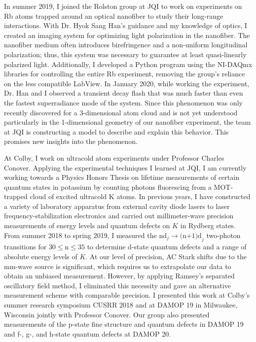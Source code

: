 \documentclass[12pt]{article}
\begin{document}
In summer 2019, I joined the Rolston group at JQI to work on  experiments on Rb atoms trapped around an optical nanofiber to study their long-range interactions. With Dr. Hyok Sang Han's guidance and my knowledge of optics, I created an imaging system for optimizing light polarization in the nanofiber. The nanofiber medium often introduces birefringence and a non-uniform longitudinal polarization; thus, this system was necessary to guarantee at least  quasi-linearly polarized light. Additionally, I developed a Python program using the NI-DAQmx libraries for controlling the entire Rb experiment, removing the group's reliance on the less compatible LabView. In January 2020, while working the experiment, Dr. Han and I observed a transient decay flash that was much faster than even the fastest superradiance mode of the system. Since this phenomenon was only recently discovered for a 3-dimensional atom cloud and is not yet understood particularly in the 1-dimensional geometry of our nanofiber experiment, the team at JQI is constructing a model to describe and explain this behavior. This promises new insights into the phenomenon.  \\ \vspace{-10pt}

At Colby, I work on ultracold atom experiments under Professor Charles Conover. Applying the experimental techniques I learned at JQI, I am currently working towards a Physics Honors Thesis on lifetime measurements of certain quantum states in potassium by counting photons fluorescing from a MOT-trapped cloud of excited ultracold K atoms. In previous years, I have constructed a variety of laboratory apparatus from external cavity diode lasers to laser frequency-stabilization electronics and carried out millimeter-wave precision measurements of energy levels and quantum defects on $K$ in Rydberg states. From summer 2018 to spring 2019, I measured the $\mbox{nd}_{j} \to \mbox{(n+1)d}_{j}$ two-photon transitions for $\mbox{30} \leq \mbox{n} \leq \mbox{35}$ to determine d-state quantum defects and a range of absolute energy levels of $K$. At our level of precision, AC Stark shifts due to the mm-wave source is significant, which requires us to extrapolate our data to obtain an unbiased measurement. However, by applying Ramsey's separated oscillatory field method, I eliminated this necessity and gave an alternative measurement scheme with comparable precision. I presented this work at Colby's summer research symposium CUSRR 2018 and at DAMOP 19 in Milwaukee, Wisconsin jointly with Professor Conover. Our group also presented measurements of the p-state fine structure and quantum defects in DAMOP 19 and f-, g-, and h-state quantum defects at DAMOP 20. \\ \vspace{-10pt}
\end{document}
